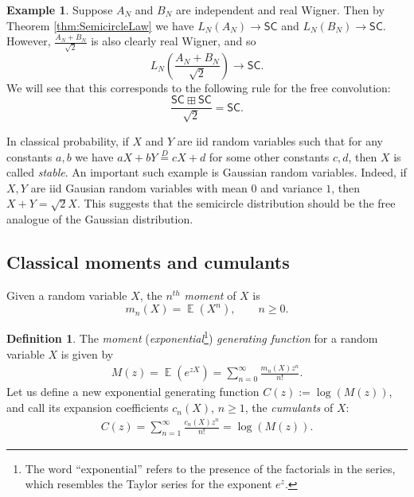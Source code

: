 \documentclass[letterpaper,11pt,oneside,reqno]{amsart}
\numberwithin{equation}{section}
\newcommand{\SC}{\mathsf{SC}}
\DeclareMathOperator{\EE}{\mathbb{E}}
\theoremstyle{definition}
\newtheorem{definition}[proposition]{Definition}
\newtheorem{example}[proposition]{Example}
\begin{document}
\begin{example}
	Suppose $A_N$ and $B_N$ are independent and real Wigner. 
	Then by Theorem \ref{thm:SemicircleLaw} we have
	$L_N(A_N)\to \SC$ and $L_N(B_N)\to \SC$. However, 
	$\displaystyle\frac{A_N+B_N}{\sqrt{2}}$ is also clearly real Wigner, and so
	\begin{equation*}
		L_N\left(\frac{A_N+B_N}{\sqrt{2}}\right) \to \SC.
	\end{equation*}
	We will see that this corresponds to the following
	rule for the free convolution:
	\begin{equation}\label{free_conv_SC}
		\frac{\SC\boxplus\SC}{\sqrt{2}}=\SC.
	\end{equation}

	In classical probability, if $X$ and $Y$ are iid random variables 
	such that for any constants $a,b$ we have 
	$aX+bY\stackrel{D}{=} cX+d$ for some other constants $c,d$, then $X$ is called
	\emph{stable}. An important such example is Gaussian random variables.
	Indeed, if  $X,Y$ are iid Gausian random variables with mean $0$
	and variance $1$, then
	$X+Y=\sqrt{2}X$.  
	This suggests that the semicircle distribution should
	be the free analogue of the Gaussian distribution.
\end{example}


\subsection{Classical moments and cumulants} %
\label{sub:classical_moments_and_cumulants}

Given a random variable $X$, the $n^{th}$ \emph{moment} of $X$ is
\begin{equation*}
	m_n(X)=\EE(X^n),\qquad n\geq 0.
\end{equation*}

\begin{definition}
The \emph{moment} (\emph{exponential}\footnote{The word
``exponential'' refers to the presence of the factorials in the series, which
resembles the Taylor series for the exponent $e^{z}$.}) \emph{generating function} for a random variable $X$ is given by 
\begin{align}\label{Moment_Gen}
\displaystyle M(z)=\EE (e^{z X})=\sum_{n=0}^\infty \frac{m_n(X)z^n}{n!}.
\end{align}
Let us define a new exponential generating function $C(z):=\log(M(z))$, and call its expansion coefficients $c_n(X)$, $n\ge1$,
the \emph{cumulants} of $X$:
\begin{align}\label{Cumulant_Gen}
\displaystyle C(z)=\sum_{n=1}^\infty \frac{c_n(X)z^n}{n!}=\log(M(z)).
\end{align}
\end{definition}
\end{document}
